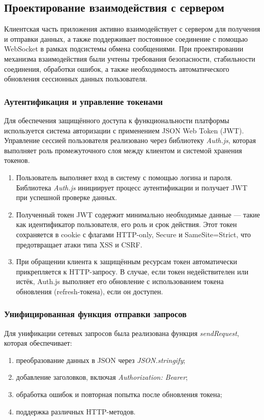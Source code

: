 \subsection{Проектирование взаимодействия с сервером}

Клиентская часть приложения активно взаимодействует с сервером для получения и отправки данных, а также поддерживает постоянное соединение с помощью WebSocket в рамках подсистемы обмена сообщениями. При проектировании механизма взаимодействия были учтены требования безопасности, стабильности соединения, обработки ошибок, а также необходимость автоматического обновления сессионных данных пользователя.

\subsubsection{Аутентификация и управление токенами}
Для обеспечения защищённого доступа к функциональности платформы используется система авторизации с применением JSON Web Token (JWT). Управление сессией пользователя реализовано через библиотеку \textit{Auth.js}, которая выполняет роль промежуточного слоя между клиентом и системой хранения токенов.

\begin{enumerate}
  \item Пользователь выполняет вход в систему с помощью логина и пароля. Библиотека \textit{Auth.js} инициирует процесс аутентификации и получает JWT при успешной проверке данных.
  \item Полученный токен JWT содержит минимально необходимые данные — такие как идентификатор пользователя, его роль и срок действия. Этот токен сохраняется в cookie с флагами HTTP-only, Secure и SameSite=Strict, что предотвращает атаки типа XSS и CSRF.
  \item При обращении клиента к защищённым ресурсам токен автоматически прикрепляется к HTTP-запросу. В случае, если токен недействителен или истёк, Auth.js выполняет его обновление с использованием токена обновления (refresh-токена), если он доступен.
\end{enumerate}

\subsubsection{Унифицированная функция отправки запросов}
Для унификации сетевых запросов была реализована функция \textit{sendRequest}, которая обеспечивает:

\begin{enumerate}
  \item преобразование данных в JSON через \textit{JSON.stringify};
  \item добавление заголовков, включая \textit{Authorization: Bearer};
  \item обработка ошибок и повторная попытка после обновления токена;
  \item поддержка различных HTTP-методов.
\end{enumerate}

